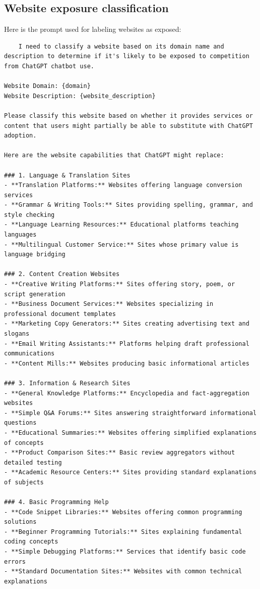 \documentclass[12pt]{article}
\begin{document}
\subsection{Website exposure classification} \label{sec:exposure_prompt}

Here is the prompt used for labeling websites as exposed:

\tiny{
\begin{verbatim}
    I need to classify a website based on its domain name and description to determine if it's likely to be exposed to competition from ChatGPT chatbot use.

Website Domain: {domain}
Website Description: {website_description}

Please classify this website based on whether it provides services or content that users might partially be able to substitute with ChatGPT adoption.

Here are the website capabilities that ChatGPT might replace:

### 1. Language & Translation Sites
- **Translation Platforms:** Websites offering language conversion services
- **Grammar & Writing Tools:** Sites providing spelling, grammar, and style checking
- **Language Learning Resources:** Educational platforms teaching languages
- **Multilingual Customer Service:** Sites whose primary value is language bridging

### 2. Content Creation Websites
- **Creative Writing Platforms:** Sites offering story, poem, or script generation
- **Business Document Services:** Websites specializing in professional document templates
- **Marketing Copy Generators:** Sites creating advertising text and slogans
- **Email Writing Assistants:** Platforms helping draft professional communications
- **Content Mills:** Websites producing basic informational articles

### 3. Information & Research Sites
- **General Knowledge Platforms:** Encyclopedia and fact-aggregation websites
- **Simple Q&A Forums:** Sites answering straightforward informational questions
- **Educational Summaries:** Websites offering simplified explanations of concepts
- **Product Comparison Sites:** Basic review aggregators without detailed testing
- **Academic Resource Centers:** Sites providing standard explanations of subjects

### 4. Basic Programming Help
- **Code Snippet Libraries:** Websites offering common programming solutions
- **Beginner Programming Tutorials:** Sites explaining fundamental coding concepts
- **Simple Debugging Platforms:** Services that identify basic code errors
- **Standard Documentation Sites:** Websites with common technical explanations


\end{verbatim}}
\end{document}

